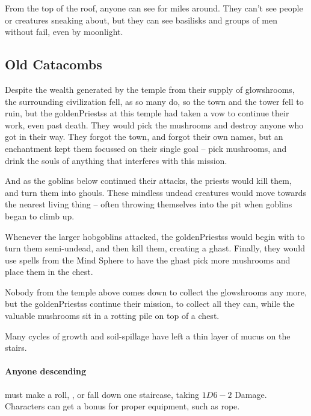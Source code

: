 \begin{multicols}{2}
From the top of the roof, anyone can see for miles around.
They can't see people or creatures sneaking about, but they can see \glspl{basilisk} and groups of men without fail, even by moonlight.

\needspace{14em}
\subsection{Old Catacombs}
\label{catacombsUnderTower}

\begin{exampletext}

  Despite the wealth generated by the temple from their supply of \glspl{glowshroom}, the surrounding civilization fell, as so many do, so the town and the tower fell to ruin, but the \glspl{goldenPriests} at this temple had taken a vow to continue their work, even past death.
  They would pick the mushrooms and destroy anyone who got in their way.
  They forgot the town, and forgot their own names, but an enchantment kept them focussed on their single goal -- pick mushrooms, and drink the souls of anything that interferes with this mission.

  And as the goblins below continued their attacks, the priests would kill them, and turn them into ghouls.
  These mindless undead creatures would move towards the nearest living thing -- often throwing themselves into the pit when goblins began to climb up.

  Whenever the larger hobgoblins attacked, the \glspl{goldenPriests} would begin with  to turn them semi-undead, and then kill them, creating a ghast.%
  Finally, they would use spells from the Mind Sphere to have the ghast pick more mushrooms and place them in the chest.

  Nobody from the temple above comes down to collect the \glspl{glowshroom} any more, but the \glspl{goldenPriests} continue their mission, to collect all they can, while the valuable mushrooms sit in a rotting pile on top of a chest.
\end{exampletext}



Many \glspl{cycle} of growth and soil-spillage have left a thin layer of mucus on the stairs.

\paragraph{Anyone descending}
must make a  roll, \tn[8], or fall down one staircase, taking $1D6-2$ Damage.
Characters can get a bonus for proper equipment, such as rope.


\end{multicols}
